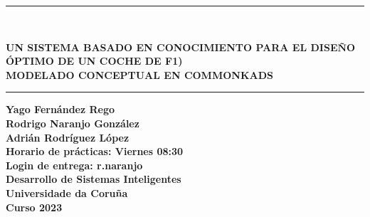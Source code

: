 \documentclass[12pt,a4paper,twoside,spanish]{article}      %
\begin{document}
\def\chaptername{Capítulo}
\def\tablename{Tabla}
\def\listtablename{Índice de Tablas}
\chapterfont{\LARGE\raggedleft}

\pagestyle{empty}

\begin{titlepage}
\setlength{\parindent}{0cm} \setlength{\parskip}{0cm}


\newcommand{\HRule}{\rule{\linewidth}{1mm}}

\vspace*{2cm}
\HRule \\[0.5cm]
\begin{center}
\textsf{\textbf{\large UN SISTEMA BASADO EN CONOCIMIENTO PARA EL DISEÑO ÓPTIMO DE UN COCHE DE F1)\\[0.75cm] MODELADO CONCEPTUAL EN COMMONKADS \\[0.5cm]}}
\HRule \vspace*{3cm}

\textsf{\textbf{\normalsize Yago Fernández Rego\\ Rodrigo Naranjo González\\ Adrián Rodríguez López\\[5cm]
Horario de prácticas: Viernes 08:30\\
Login de entrega: r.naranjo\\[2.5cm]
Desarrollo de Sistemas Inteligentes\\
Universidade da Coruña \\ Curso
2023}}
\end{center}
\end{titlepage}

\cleardoublepage


\tableofcontents
\cleardoublepage


\end{document}
